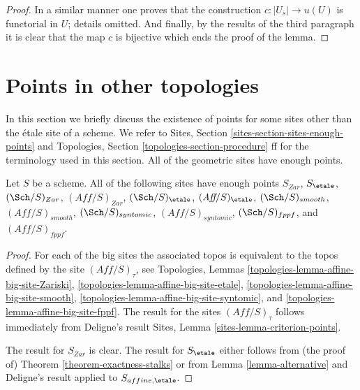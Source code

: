 \begin{proof}
\medskip\noindent
In a similar manner one proves that the construction
$c : |U_{\overline{s}}| \to u(U)$ is functorial in $U$;
details omitted. And finally, by the results of the
third paragraph it is clear that the map $c$ is bijective
which ends the proof of the lemma.
\end{proof}







\section{Points in other topologies}
\label{section-points-topologies}

\noindent
In this section we briefly discuss the existence of points for some
sites other than the \'etale site of a scheme. We refer to
Sites, Section \ref{sites-section-sites-enough-points}
and
Topologies, Section \ref{topologies-section-procedure} ff
for the terminology used in this section.
All of the geometric sites have enough points.

\begin{lemma}
\label{lemma-points-fppf}
Let $S$ be a scheme. All of the following sites have enough points
$S_{Zar}$, $S_\etale$,
$(\Sch/S)_{Zar}$, $(\textit{Aff}/S)_{Zar}$,
$(\Sch/S)_\etale$, $(\textit{Aff}/S)_\etale$,
$(\Sch/S)_{smooth}$, $(\textit{Aff}/S)_{smooth}$,
$(\Sch/S)_{syntomic}$, $(\textit{Aff}/S)_{syntomic}$,
$(\Sch/S)_{fppf}$, and $(\textit{Aff}/S)_{fppf}$.
\end{lemma}

\begin{proof}
For each of the big sites the associated topos is equivalent to the
topos defined by the site $(\textit{Aff}/S)_\tau$, see
Topologies, Lemmas \ref{topologies-lemma-affine-big-site-Zariski},
\ref{topologies-lemma-affine-big-site-etale},
\ref{topologies-lemma-affine-big-site-smooth},
\ref{topologies-lemma-affine-big-site-syntomic}, and
\ref{topologies-lemma-affine-big-site-fppf}.
The result for the sites $(\textit{Aff}/S)_\tau$ follows immediately
from Deligne's result
Sites, Lemma \ref{sites-lemma-criterion-points}.

\medskip\noindent
The result for $S_{Zar}$ is clear. The result for $S_\etale$
either follows from (the proof of)
Theorem \ref{theorem-exactness-stalks}
or from
Lemma \ref{lemma-alternative}
and Deligne's result applied to $S_{affine, \etale}$.
\end{proof}

